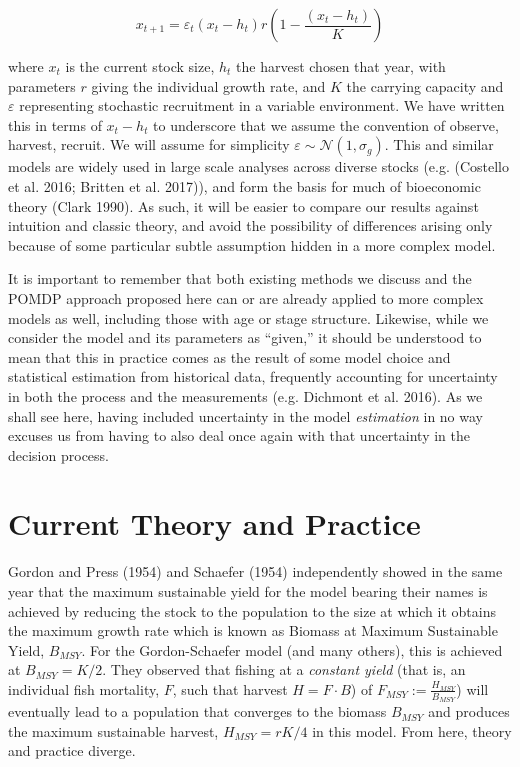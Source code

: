 \documentclass[3p]{elsarticle} %
\begin{document}
\begin{equation}
x_{t+1} = \varepsilon_t (x_t-h_t) r  \left(1 - \frac{(x_t-h_t)}{K}\right) \label{Gordon-Schaefer}
\end{equation}

where \(x_t\) is the current stock size, \(h_t\) the harvest chosen that
year, with parameters \(r\) giving the individual growth rate, and \(K\)
the carrying capacity and \(\varepsilon\) representing stochastic
recruitment in a variable environment. We have written this in terms of
\(x_t - h_t\) to underscore that we assume the convention of observe,
harvest, recruit. We will assume for simplicity
\(\varepsilon \sim \mathcal{N}(1, \sigma_g)\). This and similar models
are widely used in large scale analyses across diverse stocks (e.g.
(Costello et al. 2016; Britten et al. 2017)), and form the basis for
much of bioeconomic theory (Clark 1990). As such, it will be easier to
compare our results against intuition and classic theory, and avoid the
possibility of differences arising only because of some particular
subtle assumption hidden in a more complex model.

It is important to remember that both existing methods we discuss and
the POMDP approach proposed here can or are already applied to more
complex models as well, including those with age or stage structure.
Likewise, while we consider the model and its parameters as ``given,''
it should be understood to mean that this in practice comes as the
result of some model choice and statistical estimation from historical
data, frequently accounting for uncertainty in both the process and the
measurements (e.g. Dichmont et al. 2016). As we shall see here, having
included uncertainty in the model \emph{estimation} in no way excuses us
from having to also deal once again with that uncertainty in the
decision process.

\hypertarget{current-theory-and-practice}{%
\section{Current Theory and
Practice}\label{current-theory-and-practice}}

Gordon and Press (1954) and Schaefer (1954) independently showed in the
same year that the maximum sustainable yield for the model bearing their
names is achieved by reducing the stock to the population to the size at
which it obtains the maximum growth rate which is known as Biomass at
Maximum Sustainable Yield, \(B_{MSY}\). For the Gordon-Schaefer model
(and many others), this is achieved at \(B_{MSY} = K/2\). They observed
that fishing at a \emph{constant yield} (that is, an individual fish
mortality, \(F\), such that harvest \(H = F \cdot B\)) of
\(F_{MSY} := \tfrac{H_{MSY}}{B_{MSY}}\)) will eventually lead to a
population that converges to the biomass \(B_{MSY}\) and produces the
maximum sustainable harvest, \(H_{MSY} = r K / 4\) in this model. From
here, theory and practice diverge.
\end{document}
